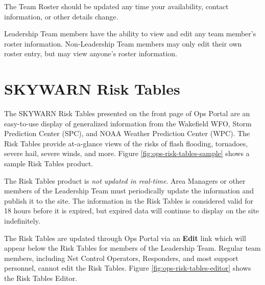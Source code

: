 \documentclass[pdflatex,letterpaper,twoside,12pt]{book}
\begin{document}
The Team Roster should be updated any time your availability, contact information, or other details change.

Leadership Team members have the ability to view and edit any team member's roster information.  Non-Leadership Team members may only edit their own roster entry, but may view anyone's roster information.


\section{SKYWARN Risk Tables}\label{risk-tables-intro}

The SKYWARN Risk Tables presented on the front page of Ops Portal are an easy-to-use display of generalized information from the Wakefield WFO, Storm Prediction Center (SPC), and NOAA Weather Prediction Center (WPC).  The Risk Tables provide at-a-glance views of the risks of flash flooding, tornadoes, severe hail, severe winds, and more.  Figure \ref{fig:ops-risk-tables-sample} shows a sample Risk Tables product.

The Risk Tables product is \emph{not updated in real-time}.  Area Managers or other members of the Leadership Team must periodically update the information and publish it to the site.  The information in the Risk Tables is considered valid for 18 hours before it is expired, but expired data will continue to display on the site indefinitely.

The Risk Tables are updated through Ops Portal via an \textbf{Edit} link which will appear below the Risk Tables for members of the Leadership Team.  Regular team members, including Net Control Operators, Responders, and most support personnel, cannot edit the Risk Tables.  Figure \ref{fig:ops-risk-tables-editor} shows the Risk Tables Editor.

\end{document}
